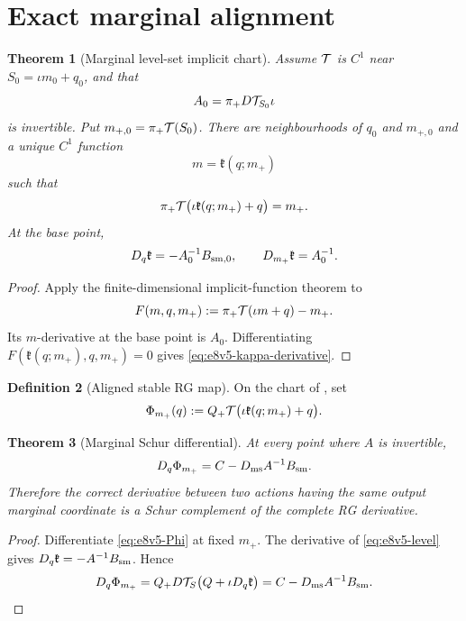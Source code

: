 \documentclass[11pt,oneside]{book}
\newtheorem{theorem}{Theorem}[chapter]
\theoremstyle{definition}
\newtheorem{definition}[theorem]{Definition}
\theoremstyle{remark}
\begin{document}
\section{Exact marginal alignment}
\label{sec:e8v5-alignment}

\begin{theorem}[Marginal level-set implicit chart]
\label{thm:e8v5-IFT}
Assume \({\cal T}\) is \(C^1\) near
\(S_0=\iota m_0+q_0\), and that
\[
 A_0=\pi_+D{\cal T}_{S_0}\iota                    \label{eq:e8v5-A0}
\]
is invertible.  Put
\(m_{+,0}=\pi_+{\cal T}(S_0)\).
There are neighbourhoods of \(q_0\) and \(m_{+,0}\) and a unique
\(C^1\) function
\[
 m={\mathfrak k}(q;m_+)                             \label{eq:e8v5-kappa}
\]
such that
\[
 \pi_+{\cal T}\bigl(\iota{\mathfrak k}(q;m_+)+q\bigr)
 =m_+.                                               \label{eq:e8v5-level}
\]
At the base point,
\[
 D_q{\mathfrak k}=-A_0^{-1}B_{{\rm sm},0},
 \qquad
 D_{m_+}{\mathfrak k}=A_0^{-1}.                     \label{eq:e8v5-kappa-derivative}
\]
\end{theorem}

\begin{proof}
Apply the finite-dimensional implicit-function theorem to
\[
 F(m,q,m_+):=\pi_+{\cal T}(\iota m+q)-m_+.
\]
Its \(m\)-derivative at the base point is \(A_0\).  Differentiating
\(F({\mathfrak k}(q;m_+),q,m_+)=0\) gives
\eqref{eq:e8v5-kappa-derivative}.
\end{proof}

\begin{definition}[Aligned stable RG map]
\label{def:e8v5-aligned}
On the chart of , set
\[
 \Phi_{m_+}(q):=
 Q_+{\cal T}\bigl(\iota{\mathfrak k}(q;m_+)+q\bigr). \label{eq:e8v5-Phi}
\]
\end{definition}

\begin{theorem}[Marginal Schur differential]
\label{thm:e8v5-Schur}
At every point where \(A\) is invertible,
\[
 D_q\Phi_{m_+}
 =C-D_{\rm ms}A^{-1}B_{\rm sm}.                     \label{eq:e8v5-Schur}
\]
Therefore the correct derivative between two actions having the same
output marginal coordinate is a Schur complement of the complete RG
derivative.
\end{theorem}

\begin{proof}
Differentiate \eqref{eq:e8v5-Phi} at fixed \(m_+\).  The derivative
of \eqref{eq:e8v5-level} gives
\(D_q{\mathfrak k}=-A^{-1}B_{\rm sm}\).  Hence
\[
 D_q\Phi_{m_+}
 =Q_+D{\cal T}_S\bigl(Q+\iota D_q{\mathfrak k}\bigr)
 =C-D_{\rm ms}A^{-1}B_{\rm sm}.
\]
\end{proof}
\end{document}

